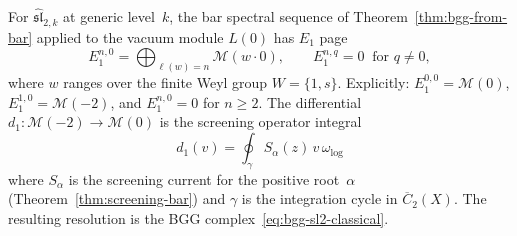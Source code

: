 \begin{proposition}
\label{prop:bar-bgg-sl2}

For $\widehat{\mathfrak{sl}}_{2,k}$ at generic level~$k$,
the bar spectral sequence of
Theorem~\textup{\ref{thm:bgg-from-bar}} applied to the
vacuum module $L(0)$ has $E_1$ page
\begin{equation}\label{eq:bar-bgg-sl2-E1}
E_1^{n,0} = \bigoplus_{\ell(w) = n} \mathcal{M}(w \cdot 0),
\qquad E_1^{n,q} = 0 \;\;\text{for } q \neq 0,
\end{equation}
where $w$ ranges over the finite Weyl group
$W = \{1, s\}$.  Explicitly:
$E_1^{0,0} = \mathcal{M}(0)$,
$E_1^{1,0} = \mathcal{M}(-2)$, and
$E_1^{n,0} = 0$ for $n \geq 2$.
The differential
$d_1\colon \mathcal{M}(-2) \to \mathcal{M}(0)$
is the screening operator integral
\begin{equation}\label{eq:bar-bgg-sl2-screening}
d_1(v) = \oint_{\gamma} S_\alpha(z)\, v\, \omega_{\log}
\end{equation}
where $S_\alpha$ is the screening current for the positive
root~$\alpha$ \textup{(}Theorem~\textup{\ref{thm:screening-bar})}
and $\gamma$ is the integration cycle in
$\overline{C}_2(X)$.  The resulting resolution is the
BGG complex~\eqref{eq:bgg-sl2-classical}.
\end{proposition}


